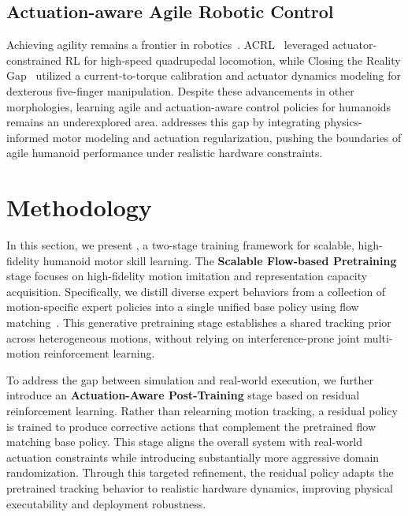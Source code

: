 \subsection{Actuation-aware Agile Robotic Control}
Achieving agility remains a frontier in robotics~\cite{kim2025high,li2025reinforcement,he2024agile,kim2019highly,hwangbo2019learning,margolis2024rapid,zhang2024learning,hoeller2024anymal,cheng2024extreme,zhuang2023robot,zhuang2024humanoid,xie2025kungfubot}. ACRL~\cite{shin2023actuator} leveraged actuator-constrained RL for high-speed quadrupedal locomotion, while Closing the Reality Gap~\cite{zhao2026closing} utilized a current-to-torque calibration and actuator dynamics modeling for dexterous five-finger manipulation. Despite these advancements in other morphologies, learning agile and actuation-aware control policies for humanoids remains an underexplored area. \model addresses this gap by integrating physics-informed motor modeling and actuation regularization, pushing the boundaries of agile humanoid performance under realistic hardware constraints.


\section{Methodology}
In this section, we present \model, a two-stage training framework for scalable, high-fidelity humanoid motor skill learning. 
The \textbf{Scalable Flow-based Pretraining} stage focuses on high-fidelity motion imitation and representation capacity acquisition. 
Specifically, we distill diverse expert behaviors from a collection of motion-specific expert policies into a single unified base policy using flow matching~\cite{lipman2022flow}. 
This generative pretraining stage establishes a shared tracking prior across heterogeneous motions, without relying on interference-prone joint multi-motion reinforcement learning.

To address the gap between simulation and real-world execution, we further introduce an \textbf{Actuation-Aware Post-Training} stage based on residual reinforcement learning. 
Rather than relearning motion tracking, a residual policy is trained to produce corrective actions that complement the pretrained flow matching base policy. This stage aligns the overall system with real-world actuation constraints while introducing substantially more aggressive domain randomization.
Through this targeted refinement, the residual policy adapts the pretrained tracking behavior to realistic hardware dynamics, improving physical executability and deployment robustness.

